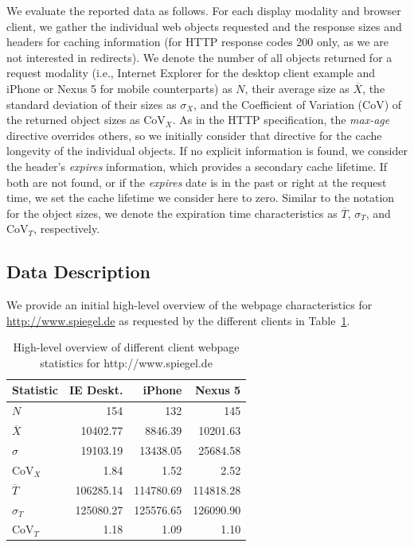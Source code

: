 \documentclass[letterpaper,conference]{IEEEtran}
\begin{document}
We evaluate the reported data as follows. For each display modality and browser client, we gather the individual web objects requested and the response sizes and headers for caching information (for HTTP response codes 200 only, as we are not interested in redirects).
We denote the number of all objects returned for a request modality (i.e., Internet Explorer for the desktop client example and iPhone or Nexus 5 for mobile counterparts) as $N$, their average size as $\overline{X}$, the standard deviation of their sizes as ${\sigma}_{X}$, and the Coefficient of Variation (CoV) of the returned object sizes as $\mathrm{CoV}_{X}$. As in the HTTP specification, the \emph{max-age} directive overrides others, so we initially consider that directive for the cache longevity of the individual objects. If no explicit information is found, we consider the header's \emph{expires} information, which provides a secondary cache lifetime. If both are not found, or if the \emph{expires} date is in the past or right at the request time, we set the cache lifetime we consider here to zero. 
Similar to the notation for the object sizes, we denote the expiration time characteristics as $\overline{T}$, $\sigma_{T}$, and $\mathrm{CoV}_{T}$, respectively.


\subsection{Data Description}

We provide an initial high-level overview of the webpage characteristics for \url{http://www.spiegel.de} as requested by the different clients in Table~\ref{tab:spiegel}.
\begin{table}
\centering
\caption{High-level overview of different client webpage statistics for http://www.spiegel.de}
\label{tab:spiegel}
\begin{tabular}{|l|r|r|r|}
	\hline
	Statistic          & IE Deskt. &    iPhone &   Nexus 5 \\ \hline
	$N$                &       154 &       132 &       145 \\ \hline\hline
	$\overline{X}$     &  10402.77 &   8846.39 &  10201.63 \\ \hline
	$\sigma$           &  19103.19 &  13438.05 &  25684.58 \\ \hline
	$\mathrm{CoV}_{X}$ &      1.84 &      1.52 &      2.52 \\ \hline\hline
	$\overline{T}$     & 106285.14 & 114780.69 & 114818.28 \\ \hline
	$\sigma_{T}$       & 125080.27 & 125576.65 & 126090.90 \\ \hline
	$\mathrm{CoV}_{T}$ &      1.18 &      1.09 &      1.10 \\ \hline
\end{tabular}
\end{table}
\end{document}
